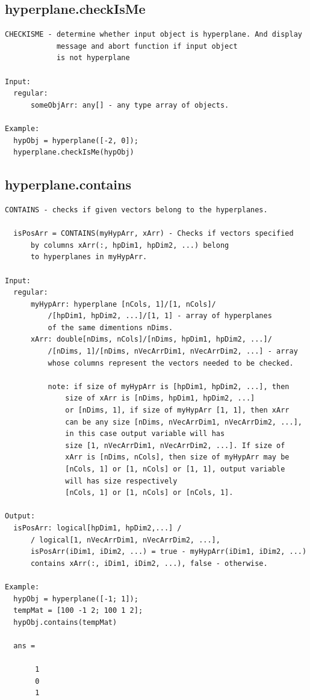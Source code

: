 \documentclass[letterpaper,10pt,english]{sphinxmanual}
\begin{document}
\subsection{hyperplane.checkIsMe}
\label{chap_functions:hyperplane-checkisme}
\begin{Verbatim}[commandchars=\\\{\}]
CHECKISME - determine whether input object is hyperplane. And display
            message and abort function if input object
            is not hyperplane

Input:
  regular:
      someObjArr: any[] - any type array of objects.

Example:
  hypObj = hyperplane([-2, 0]);
  hyperplane.checkIsMe(hypObj)
\end{Verbatim}


\subsection{hyperplane.contains}
\label{chap_functions:hyperplane-contains}
\begin{Verbatim}[commandchars=\\\{\}]
CONTAINS - checks if given vectors belong to the hyperplanes.

  isPosArr = CONTAINS(myHypArr, xArr) - Checks if vectors specified
      by columns xArr(:, hpDim1, hpDim2, ...) belong
      to hyperplanes in myHypArr.

Input:
  regular:
      myHypArr: hyperplane [nCols, 1]/[1, nCols]/
          /[hpDim1, hpDim2, ...]/[1, 1] - array of hyperplanes
          of the same dimentions nDims.
      xArr: double[nDims, nCols]/[nDims, hpDim1, hpDim2, ...]/
          /[nDims, 1]/[nDims, nVecArrDim1, nVecArrDim2, ...] - array
          whose columns represent the vectors needed to be checked.

          note: if size of myHypArr is [hpDim1, hpDim2, ...], then
              size of xArr is [nDims, hpDim1, hpDim2, ...]
              or [nDims, 1], if size of myHypArr [1, 1], then xArr
              can be any size [nDims, nVecArrDim1, nVecArrDim2, ...],
              in this case output variable will has
              size [1, nVecArrDim1, nVecArrDim2, ...]. If size of
              xArr is [nDims, nCols], then size of myHypArr may be
              [nCols, 1] or [1, nCols] or [1, 1], output variable
              will has size respectively
              [nCols, 1] or [1, nCols] or [nCols, 1].

Output:
  isPosArr: logical[hpDim1, hpDim2,...] /
      / logical[1, nVecArrDim1, nVecArrDim2, ...],
      isPosArr(iDim1, iDim2, ...) = true - myHypArr(iDim1, iDim2, ...)
      contains xArr(:, iDim1, iDim2, ...), false - otherwise.

Example:
  hypObj = hyperplane([-1; 1]);
  tempMat = [100 -1 2; 100 1 2];
  hypObj.contains(tempMat)

  ans =

       1
       0
       1
\end{Verbatim}
\end{document}
